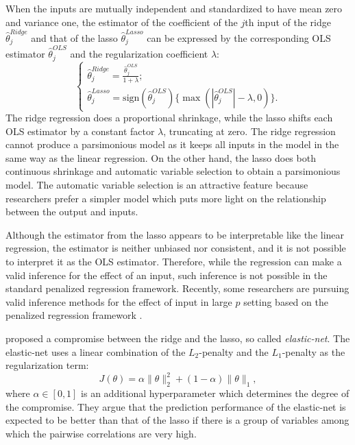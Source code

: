 \documentclass[12pt]{article}
\begin{document}
When the inputs are mutually independent and standardized to have mean zero and variance one, the estimator of the coefficient of the $j$th input of the ridge $\hat{\theta}_j^{Ridge}$ and that of the lasso $\hat{\theta}_j^{Lasso}$ can be expressed by the corresponding OLS estimator $\hat{\theta}_j^{OLS}$ and the regularization coefficient $\lambda$:
\begin{equation*}
\begin{cases}
\hat{\theta}_j^{Ridge} = \frac{\hat{\theta}_j^{OLS}}{1+\lambda};\\
\hat{\theta}_j^{Lasso} = {\mathrm {sign}}(\hat{\theta}_j^{OLS})\{\max (|\hat{\theta}_j^{OLS}| - \lambda, 0) \}.
\end{cases}
\end{equation*}
The ridge regression does a proportional shrinkage, while the lasso shifts each OLS estimator by a constant factor $\lambda$, truncating at zero. The ridge regression cannot produce a parsimonious model as it keeps all inputs in the model in the same way as the linear regression. On the other hand, the lasso does both continuous shrinkage and automatic variable selection to obtain a parsimonious model. The automatic variable selection is an attractive feature because researchers prefer a simpler model which puts more light on the relationship between the output and inputs.

Although the estimator from the lasso appears to be interpretable like the linear regression, the estimator is neither unbiased nor consistent, and it is not possible to interpret it as the OLS estimator. Therefore, while the regression can make a valid inference for the effect of an input, such inference is not possible in the standard penalized regression framework. Recently, some researchers are pursuing valid inference methods for the effect of input in large $p$ setting based on the penalized regression framework \parencite{Belloni2011,Belloni2010,Belloni2014,Raskutti2011}.

\textcite{Zou2005} proposed a compromise between the ridge and the lasso, so called {\it elastic-net}. The elastic-net uses a linear combination of the $L_2$-penalty and the $L_1$-penalty as the regularization term:
\begin{equation*}
J(\theta) = \alpha \|\theta\|_2^2 + (1-\alpha) \|\theta\|_1,
\end{equation*}
where $\alpha \in [0,1]$ is an additional hyperparameter which determines the degree of the compromise. 
They argue that the prediction performance of the elastic-net is expected to be better than that of the lasso if there is a group of variables among which the pairwise correlations are very high.
\end{document}

